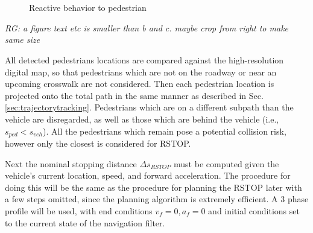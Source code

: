 \documentclass[letterpaper, 10 pt, conference]{ieeeconf}  %
\begin{document}
\begin{figure}[thpb]
\centering
  \\
  \\
  \caption{Reactive behavior to pedestrian}
  \label{fig:react}
\end{figure}
\emph{RG: a figure text etc is smaller than b and c. maybe crop from right to make same size}

All detected pedestrians locations are compared against the high-resolution digital map, so that pedestrians which are not on the roadway or near an upcoming crosswalk are not considered.
Then each pedestrian location is projected onto the total path in the same manner as described in Sec. \ref{sec:trajectorytracking}.
Pedestrians which are on a different subpath than the vehicle are disregarded, as well as those which are behind the vehicle (i.e., $s_{ped} < s_{veh}$).
All the pedestrians which remain pose a potential collision risk, however only the closest is considered for RSTOP.

Next the nominal stopping distance $\Delta s_{RSTOP}$ must be computed given the vehicle's current location, speed, and forward acceleration.
The procedure for doing this will be the same as the procedure for planning the RSTOP later with a few steps omitted, since the planning algorithm is extremely efficient.
A 3 phase profile will be used, with end conditions $v_f=0, a_f=0$ and initial conditions set to the current state of the navigation filter.
\end{document}

